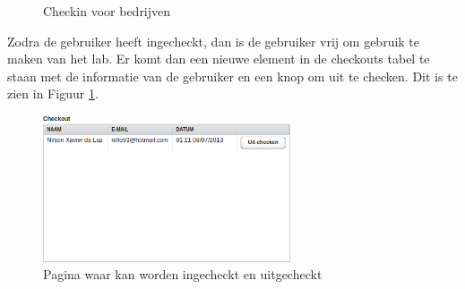 \begin{figure}[Hh]
	\centering
	\caption{Checkin voor bedrijven}
\end{figure}

Zodra de gebruiker heeft ingecheckt, dan is de gebruiker vrij om gebruik te maken van het lab. Er komt dan een nieuwe element in de checkouts tabel te staan met de informatie van de gebruiker en een knop om uit te checken. Dit is te zien in Figuur \ref{fig:checkout-table}. \\

\begin{figure}[Hh]
	\centering
	\includegraphics[width=0.65\textwidth]{Images/checkout-table.png}
	\caption{Pagina waar kan worden ingecheckt en uitgecheckt}
	\label{fig:checkout-table}
\end{figure}


